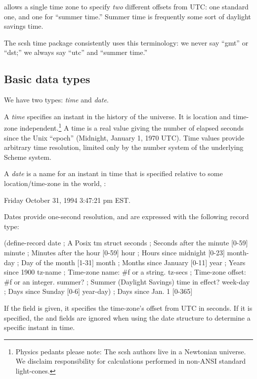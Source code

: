 {\Posix} allows a single time zone to specify \emph{two} different offsets
from UTC: one standard one, and one for ``summer time.''
Summer time is frequently some sort of daylight savings time. 

The scsh time package consistently uses this terminology: we never say
``gmt'' or ``dst;'' we always say ``utc'' and ``summer time.''

\subsection{Basic data types}    
We have two types: \emph{time} and \emph{date}.

A \emph{time} specifies an instant in the history of the universe.
It is location and time-zone independent.\footnote{Physics pedants please note:
    The scsh authors live in a Newtonian universe. We disclaim responsibility
    for calculations performed in non-ANSI standard light-cones.}
A time is a real value
giving the number of elapsed seconds since the Unix ``epoch''
(Midnight, January 1, 1970 UTC).
Time values provide arbitrary time resolution,
limited only by the number system of the underlying Scheme system.

A \emph{date} is a name for an instant in time that is specified
relative to some location/time-zone in the world, \eg:
\begin{tightinset}
    Friday October 31, 1994 3:47:21 pm EST.
\end{tightinset}
Dates provide one-second resolution, 
and are expressed with the following record type:
%
\begin{code}
(define-record date     ; A Posix tm struct
  seconds       ; Seconds after the minute [0-59]
  minute        ; Minutes after the hour [0-59]
  hour          ; Hours since midnight [0-23]
  month-day     ; Day of the month [1-31]
  month         ; Months since January [0-11]
  year          ; Years since 1900
  tz-name       ; Time-zone name: #f or a string.
  tz-secs       ; Time-zone offset: #f or an integer.
  summer?       ; Summer (Daylight Savings) time in effect?
  week-day      ; Days since Sunday [0-6]
  year-day)     ; Days since Jan. 1 [0-365]\end{code}
%
If the  field is given, it specifies the time-zone's offset from
UTC in seconds. If it is specified, the  and 
fields are ignored when using the date structure to determine a specific
instant in time.

